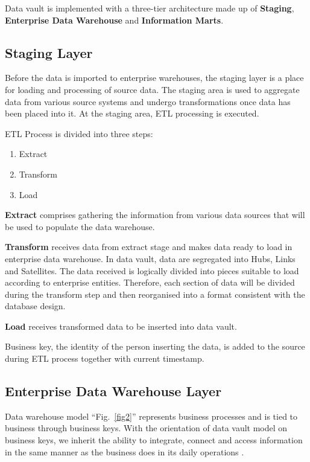 \documentclass[conference]{IEEEtran}
\begin{document}
Data vault is implemented with a three-tier architecture made up of \textbf{Staging}, \textbf{Enterprise Data Warehouse} and \textbf{Information Marts}.

\subsection{Staging Layer}

Before the data is imported to enterprise warehouses, the staging layer is a place for loading and processing of source data. The staging area is used to aggregate data from various source systems and undergo transformations once data has been placed into it. At the staging area, ETL processing is executed.

\smallskip
\noindent ETL Process is divided into three steps:

\begin{enumerate}
\item Extract
\item Transform
\item Load
\end{enumerate}

\textbf{Extract} comprises gathering the information from various data sources that will be used to populate the data warehouse.

\textbf{Transform} receives data from extract stage and makes data ready to load in enterprise data warehouse. In data vault, data are segregated into Hubs, Links and Satellites. The data received is logically divided into pieces suitable to load according to enterprise entities. Therefore, each section of data will be divided during the transform step and then reorganised into a format consistent with the database design.

\textbf{Load} receives transformed data to be inserted into data vault. 

Business key, the identity of the person inserting the data, is added to the source during ETL process together with current timestamp.

\subsection{Enterprise Data Warehouse Layer}

Data warehouse model ``Fig.~\ref{fig2}'' represents business processes and is tied to business through business keys. With the orientation of data vault model on business keys, we inherit the ability to integrate, connect and access information in the same manner as the business does in its daily operations \cite{b1}.
\end{document}
